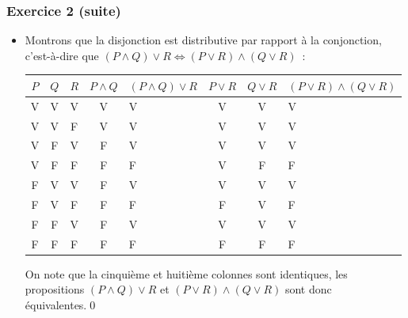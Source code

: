 \documentclass[10pt,notheorems]{beamer}
\theoremstyle{plain}
\theoremstyle{definition} %
\begin{document}
\begin{frame}
  \frametitle{Exercice 2 (suite)}
  \fontsize{8}{10}\selectfont

  \begin{itemize}

  \item Montrons que la disjonction est distributive par rapport à la conjonction, c'est-à-dire que $(P\land Q)\lor R \Leftrightarrow (P\lor R) \land (Q\lor R)$~:\newline
  \begin{table}[H]
    \centering
    \begin{tabular}[H]{|ccc|cgccg|}
      \hline
      $P$ & $Q$ & $R$ & $P\land Q$ & $(P\land Q)\lor R$ & $P\lor R$ & $Q \lor R$ & $(P\lor R)\land (Q \lor R)$ \\ \hline
      V & V & V & V & V & V & V & V \\
      V & V & F & V & V & V & V & V \\
      V & F & V & F & V & V & V & V \\
      V & F & F & F & F & V & F & F \\
      F & V & V & F & V & V & V & V \\
      F & V & F & F & F & F & V & F \\
      F & F & V & F & V & V & V & V \\
      F & F & F & F & F & F & F & F \\
      \hline\hline
    \end{tabular}
  \end{table}

  \bigskip

  On note que la cinquième et huitième colonnes sont identiques, les propositions $(P\land Q)\lor R$ et $(P\lor R) \land (Q\lor R)$ sont donc équivalentes.\qed

  \end{itemize}

\end{frame}
\end{document}
